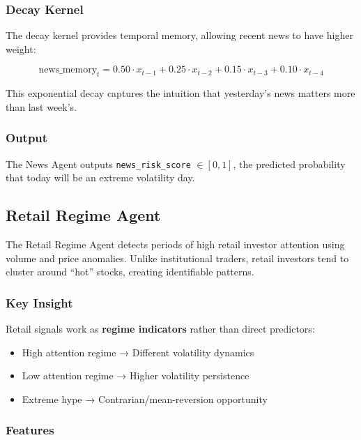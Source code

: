 \documentclass[12pt,a4paper]{article}
\begin{document}
\subsubsection{Decay Kernel}

The decay kernel provides temporal memory, allowing recent news to have higher weight:

\begin{equation}
    \text{news\_memory}_t = 0.50 \cdot x_{t-1} + 0.25 \cdot x_{t-2} + 0.15 \cdot x_{t-3} + 0.10 \cdot x_{t-4}
\end{equation}

This exponential decay captures the intuition that yesterday's news matters more than last week's.

\subsubsection{Output}

The News Agent outputs \texttt{news\_risk\_score} $\in [0, 1]$, the predicted probability that today will be an extreme volatility day.

\subsection{Retail Regime Agent}

The Retail Regime Agent detects periods of high retail investor attention using volume and price anomalies. Unlike institutional traders, retail investors tend to cluster around ``hot'' stocks, creating identifiable patterns.

\subsubsection{Key Insight}

Retail signals work as \textbf{regime indicators} rather than direct predictors:
\begin{itemize}
    \item High attention regime → Different volatility dynamics
    \item Low attention regime → Higher volatility persistence
    \item Extreme hype → Contrarian/mean-reversion opportunity
\end{itemize}

\subsubsection{Features}
\end{document}

